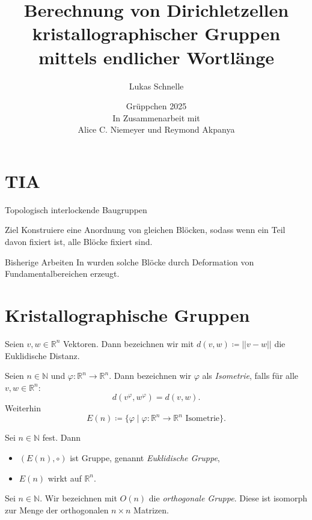 \documentclass{beamer}
\title{Berechnung von Dirichletzellen kristallographischer Gruppen mittels endlicher Wortlänge }
\author{Lukas Schnelle}
\date{Grüppchen 2025 \\ In Zusammenarbeit mit \\Alice C. Niemeyer und Reymond Akpanya}
\theoremstyle{plain}
\newcommand\R{\mathbb R}
\newcommand\N{\mathbb N}
\renewcommand{\phi}{\varphi}
\begin{document}
\frame[plain]{\titlepage}

\section{TIA}
\begin{frame}{Topologisch interlockende Baugruppen}
    \begin{exampleblock}{Ziel}
        Konstruiere eine Anordnung von gleichen Blöcken, sodass wenn ein Teil davon fixiert ist, alle Blöcke fixiert sind.
    \end{exampleblock}
    \pause
    \begin{block}{Bisherige Arbeiten}
        In \cite{GoertzenPhD} wurden solche Blöcke durch Deformation von Fundamentalbereichen erzeugt.
    \end{block}
\end{frame}

\section{Kristallographische Gruppen}
\begin{frame}
    \begin{notation}
        Seien $v, w \in \R^n$ Vektoren. \pause 
        Dann bezeichnen wir mit $d(v, w) \coloneqq ||v - w ||$ die Euklidische Distanz.
    \end{notation}
    \pause
    \begin{definition}
        Seien $n \in \N$ und $\phi: \R^n \to \R^n$. Dann bezeichnen wir $\phi$ als \emph{Isometrie}, falls für alle $v, w \in \R^n$:
        $$
            d(v^\phi, w^\phi) = d(v, w).
        $$\pause
        Weiterhin
        $$
            E(n) \coloneqq \{ \phi \mid \phi : \R^n \to \R^n \text{ Isometrie} \}.
        $$
    \end{definition}
\end{frame}

\begin{frame}
    \begin{remark}
        Sei $n \in \N$ fest. Dann
        \begin{itemize}[label=\textbullet]
            \item $(E(n), \circ)$ ist Gruppe, genannt \emph{Euklidische Gruppe},
            \item $E(n)$ wirkt auf $\R^n$.
        \end{itemize} 
    \end{remark}
    \pause
    \begin{notation}
        Sei $n \in \N$. Wir bezeichnen mit $O(n)$ die \emph{orthogonale Gruppe}. Diese ist isomorph zur Menge der orthogonalen $n \times n$ Matrizen.  
    \end{notation}
    
    
\end{frame}
\end{document}
